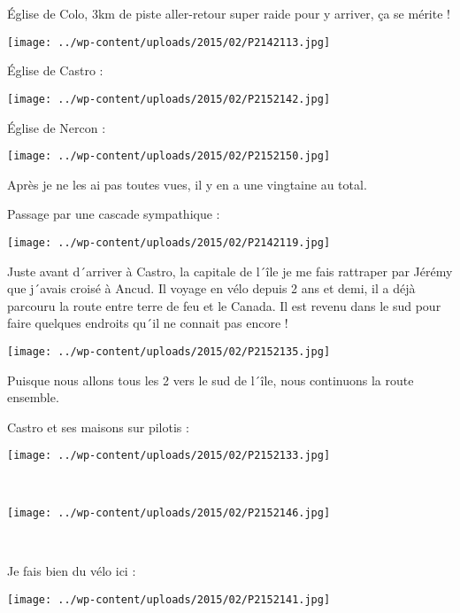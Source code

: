  \'Eglise de Colo, 3km de piste aller-retour super raide pour y arriver, ça se mérite !

\begin{center} \texttt{[image: ../wp-content/uploads/2015/02/P2142113.jpg]} \end{center}

 \'Eglise de Castro :
\begin{center} \texttt{[image: ../wp-content/uploads/2015/02/P2152142.jpg]} \end{center}

 \'Eglise de Nercon :
\begin{center} \texttt{[image: ../wp-content/uploads/2015/02/P2152150.jpg]} \end{center}

 Après je ne les ai pas toutes vues, il y en a une vingtaine au total.

 Passage par une cascade sympathique :
\begin{center} \texttt{[image: ../wp-content/uploads/2015/02/P2142119.jpg]} \end{center}

 Juste avant d´arriver à Castro, la capitale de l´île je me fais rattraper par Jérémy que j´avais croisé à Ancud. Il voyage en vélo depuis 2 ans et demi, il a déjà parcouru la route entre terre de feu et le Canada. Il est revenu dans le sud pour faire quelques endroits qu´il ne connait pas encore !
\begin{center} \texttt{[image: ../wp-content/uploads/2015/02/P2152135.jpg]} \end{center}

 Puisque nous allons tous les 2 vers le sud de l´île, nous continuons la route ensemble.

 Castro et ses maisons sur pilotis :
\begin{center} \texttt{[image: ../wp-content/uploads/2015/02/P2152133.jpg]} \end{center}
\vspace{-\topsep}

\pagebreak
~\\
\begin{center} \texttt{[image: ../wp-content/uploads/2015/02/P2152146.jpg]} \end{center}

~

 Je fais bien du vélo ici :\\
\begin{center} \texttt{[image: ../wp-content/uploads/2015/02/P2152141.jpg]} \end{center}
\vspace{-\topsep}

